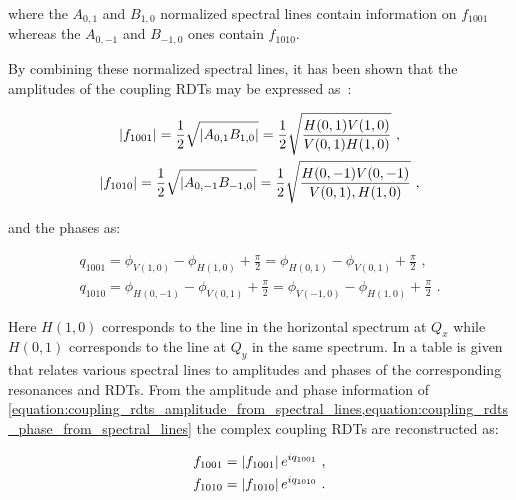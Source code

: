 \noindent
where the \(A_{0,1}\) and \(B_{1,0}\) normalized spectral lines contain information on \(f_{1001}\) whereas the \(A_{0,-1}\) and \(B_{-1,0}\) ones contain \(f_{1010}\).

By combining these normalized spectral lines, it has been shown that the amplitudes of the coupling \glspl{RDT} may be expressed as~\cite{CERN:Franchi:Computation_Coupling_Resonance_Driving_Term_Single_BPM,PRAB:Tomas:CERN_LHC_OMC}:

\begin{equation}
  \begin{gathered}
    \left\lvert f_{1001} \right\rvert = \frac{1}{2} \sqrt{\left\lvert A_{0,1} B_{1,0} \right\rvert}   = \frac{1}{2} \sqrt{\frac{H(0,1) V(1,0)}{V(0,1) H(1,0)}}       \text{ ,}  \\
    \left\lvert f_{1010} \right\rvert = \frac{1}{2} \sqrt{\left\lvert A_{0,-1} B_{-1,0} \right\rvert} = \frac{1}{2} \sqrt{\frac{H(0,-1) V(0,-1)}{V(0,1), H(1,0)}}  \text{ ,}
  \end{gathered}
  \label{equation:coupling_rdts_amplitude_from_spectral_lines}
\end{equation}
\vspace{1pt}

\noindent
and the phases as:

\begin{equation}
  \begin{gathered}
    q_{1001} = \phi_{V(1,0)} -\phi_{H(1,0)} +\frac{\pi}{2} = \phi_{H(0,1)} - \phi_{V(0,1)} + \frac{\pi}{2}      \text{ ,}  \\
    q_{1010} = \phi_{H(0,-1)} -\phi_{V(0,1)} +\frac{\pi}{2} = \phi_{V(-1,0)} - \phi_{H(1,0)} + \frac{\pi}{2}    \text{ .}
  \end{gathered}
  \label{equation:coupling_rdts_phase_from_spectral_lines}
\end{equation}
\vspace{1pt}

Here \(H(1,0)\) corresponds to the line in the horizontal spectrum at \(Q_x\) while \(H(0, 1)\) corresponds to the line at \(Q_y\) in the same spectrum.
In \cite{PRAB:Franchi:First_Simultaneous} a table is given that relates various spectral lines to amplitudes and phases of the corresponding resonances and RDTs.
From the amplitude and phase information of \cref{equation:coupling_rdts_amplitude_from_spectral_lines,equation:coupling_rdts_phase_from_spectral_lines} the complex coupling RDTs are reconstructed as:

\begin{equation}
  \begin{aligned}
    f_{1001} &= \left\lvert f_{1001} \right\rvert e^{i q_{1001}}  \text{ ,}  \\
    f_{1010} &= \left\lvert f_{1010} \right\rvert e^{i q_{1010}}  \text{ .}  \\
  \end{aligned}
  \label{equation:complex_coupling_rdts_from_phase_and_amplitude}
\end{equation}
\vspace{1pt}

